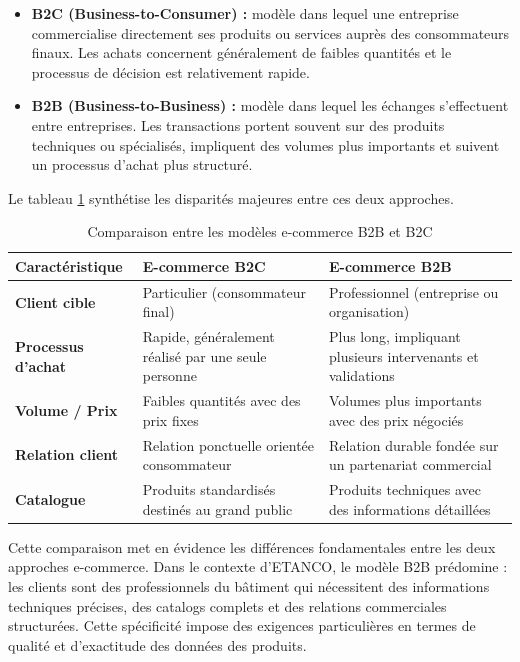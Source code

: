 \begin{itemize}
    \item \textbf{B2C (Business-to-Consumer) :} modèle dans lequel une entreprise commercialise directement ses produits ou services auprès des consommateurs finaux. Les achats concernent généralement de faibles quantités et le processus de décision est relativement rapide.

    \item \textbf{B2B (Business-to-Business) :} modèle dans lequel les échanges s'effectuent entre entreprises. Les transactions portent souvent sur des produits techniques ou spécialisés, impliquent des volumes plus importants et suivent un processus d'achat plus structuré.
\end{itemize}
\newpage
Le tableau \ref{tab:b2b_b2c} synthétise les disparités majeures entre ces deux approches.

\renewcommand{\arraystretch}{1.4}

\begin{table}[H]
    \centering
    \caption{Comparaison entre les modèles e-commerce B2B et B2C}
    \begin{tabular}{|p{3.2cm}|p{5.7cm}|p{5.7cm}|}
    \hline
    \textbf{Caractéristique} & \textbf{E-commerce B2C} & \textbf{E-commerce B2B} \\ \hline
    \textbf{Client cible} & Particulier (consommateur final) & Professionnel (entreprise ou organisation) \\ \hline
    \textbf{Processus d'achat} & Rapide, généralement réalisé par une seule personne & Plus long, impliquant plusieurs intervenants et validations \\ \hline
    \textbf{Volume / Prix} & Faibles quantités avec des prix fixes & Volumes plus importants avec des prix négociés \\ \hline
    \textbf{Relation client} & Relation ponctuelle orientée consommateur & Relation durable fondée sur un partenariat commercial \\ \hline
    \textbf{Catalogue} & Produits standardisés destinés au grand public & Produits techniques avec des informations détaillées \\ \hline
    \end{tabular}
    
    \label{tab:b2b_b2c}
\end{table}

\renewcommand{\arraystretch}{1}
Cette comparaison met en évidence les différences fondamentales entre les deux approches e-commerce. Dans le contexte d'ETANCO, le modèle B2B prédomine : les clients sont des professionnels du bâtiment qui nécessitent des informations techniques précises, des catalogs complets et des relations commerciales structurées. Cette spécificité impose des exigences particulières en termes de qualité et d'exactitude des données des produits.

